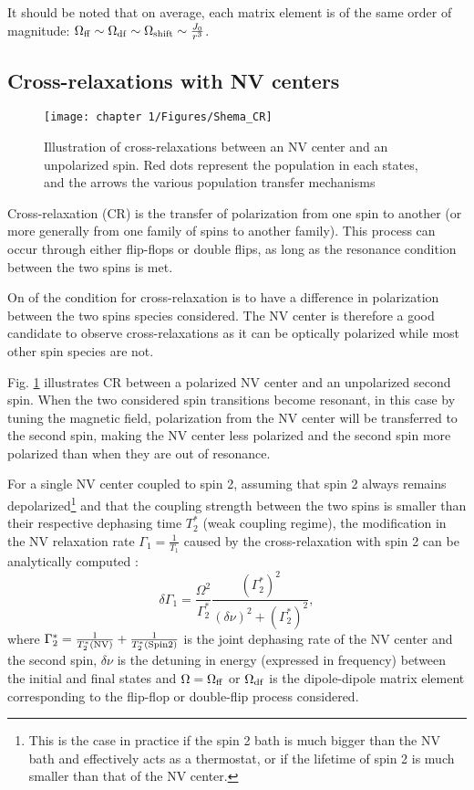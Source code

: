 \documentclass[a4paper,11pt]{report}
\begin{document}
\begin{refsection}
It should be noted that on average, each matrix element is of the same order of magnitude: $\Omega_{\rm ff} \sim \Omega_{\rm df} \sim \Omega_{\rm shift} \sim \frac{J_0}{r^3}$. 

\subsection{Cross-relaxations with NV centers}

\begin{figure}[h]
\centering
\texttt{[image: chapter 1/Figures/Shema\_CR]}
\caption{Illustration of cross-relaxations between an NV center and an unpolarized spin. Red dots represent the population in each states, and the arrows the various population transfer mechanisms}
\label{CR_shema}
\end{figure}

Cross-relaxation (CR) is the transfer of polarization from one spin to another (or more generally from one family of spins to another family). This process can occur through either flip-flops or double flips, as long as the resonance condition between the two spins is met. 

On of the condition for cross-relaxation is to have a difference in polarization between the two spins species considered. The NV center is therefore a good candidate to observe cross-relaxations as it can be optically polarized while most other spin species are not. 

Fig. \ref{CR_shema} illustrates CR between a polarized NV center and an unpolarized second spin. When the two considered spin transitions become resonant, in this case by tuning the magnetic field, polarization from the NV center will be transferred to the second spin, making the NV center less polarized and the second spin more polarized than when they are out of resonance. 

For a single NV center coupled to spin 2, assuming that spin 2 always remains depolarized\footnote{This is the case in practice if the spin 2 bath is much bigger than the NV bath and effectively acts as a thermostat, or if the lifetime of spin 2 is much smaller than that of the NV center.} and that the coupling strength between the two spins is smaller than their respective dephasing time $T_2^*$ (weak coupling regime), the modification in the NV relaxation rate $\Gamma_1=\frac{1}{T_1}$ caused by the cross-relaxation with spin 2 can be analytically computed \citep{hall2016detection}:
\begin{equation}
\delta \Gamma_1=\frac{\Omega^2}{\Gamma_2^*} \frac{(\Gamma_2^*)^2}{(\delta \nu)^2+(\Gamma_2^*)^2},
\label{delta gamma 1}
\end{equation}
where $\Gamma_2^*=\frac{1}{T_2^*(\rm NV)}+\frac{1}{T_2^*(\rm Spin 2)}$ is the joint dephasing rate of the NV center and the second spin, $\delta \nu$ is the detuning in energy (expressed in frequency) between the initial and final states and $\Omega=\Omega_{\rm ff}$ or $\Omega_{\rm df}$ is the dipole-dipole matrix element corresponding to the flip-flop or double-flip process considered. 


\end{refsection}
\end{document}
